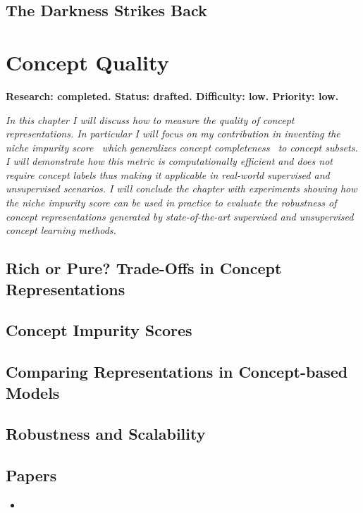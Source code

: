 \documentclass[withindex,glossary]{cam-thesis}
\begin{document}
\section{The Darkness Strikes Back}


\chapter{Concept Quality} \label{chapter:metrics}
\textbf{Research: completed. Status: drafted. Difficulty: low. Priority: low.}

\textit{In this chapter I will discuss how to measure the quality of concept representations. In particular I will focus on my contribution in inventing the niche impurity score~\citep{zarlenga2021quality} which generalizes concept completeness~\citep{yeh2020completeness} to concept subsets. I will demonstrate how this metric is computationally efficient and does not require concept labels thus making it applicable in real-world supervised and unsupervised scenarios. I will conclude the chapter with experiments showing how the niche impurity score can be used in practice to evaluate the robustness of concept representations generated by state-of-the-art supervised and unsupervised concept learning methods.}

\section{Rich or Pure? Trade-Offs in Concept Representations}

\section{Concept Impurity Scores}

\section{Comparing Representations in Concept-based Models}

\section{Robustness and Scalability}

\section*{Papers}
\nobibliography*
\begin{itemize}
    \item {}
\end{itemize}
\end{document}
